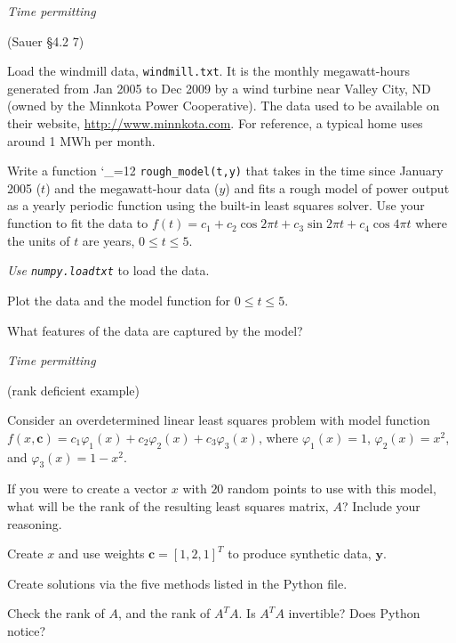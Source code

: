 \documentclass[12pt,letterpaper,noanswers]{exam}
\makeatletter
\newcommand{\pyf}{%
  \begingroup\catcode`_=12
  \pyf@
}
\newcommand{\pyf@}[1]{\texttt{#1}\endgroup}
\makeatother
\begin{document}
\begin{questions}





\question \emph{Time permitting} 

(Sauer \S4.2 7)

Load the windmill data, \texttt{windmill.txt}.  It is the monthly megawatt-hours generated from Jan 2005 to Dec 2009 by a wind turbine near Valley City, ND (owned by the Minnkota Power Cooperative).  The data used to be available on their website, \url{http://www.minnkota.com}.  For reference, a typical home uses around 1 MWh per month.
\begin{parts}
\item Write a function \pyf{rough_model(t,y)} that takes in the time since January 2005 ($t$) and the megawatt-hour data ($y$) and fits a rough model of power output as a yearly periodic function using the built-in least squares solver.  Use your function to fit the data to $f(t) = c_1 + c_2\cos 2\pi t + c_3 \sin 2\pi t + c_4 \cos 4 \pi t$ where the units of $t$ are years, $0\leq t\leq 5$.

\emph{Use \texttt{numpy.loadtxt}} to load the data.

\item Plot the data and the model function for $0\leq t\leq 5$.  

\item What features of the data are captured by the model?
\end{parts}


\question \emph{Time permitting}

(rank deficient example) 

Consider an overdetermined linear least squares problem with model function $f(x,\mathbf{c}) = c_1\varphi_1(x) + c_2\varphi_2(x) + c_3\varphi_3(x)$, where $\varphi_1(x) = 1$, $\varphi_2(x) = x^2$, and $\varphi_3(x) = 1-x^2$.

\begin{parts}
\item If you were to create a vector $x$ with $20$ random points to use with this model, what will be the rank of the resulting least squares matrix, $A$?  Include your reasoning.
\item Create $x$ and use weights $\mathbf{c} = [1,2,1]^T$ to produce synthetic data, $\mathbf{y}$.  
\item Create solutions via the five methods listed in the Python file.
\item Check the rank of $A$, and the rank of $A^TA$.  Is $A^TA$ invertible?  Does Python notice?


\end{parts}
\end{questions}
\end{document}
